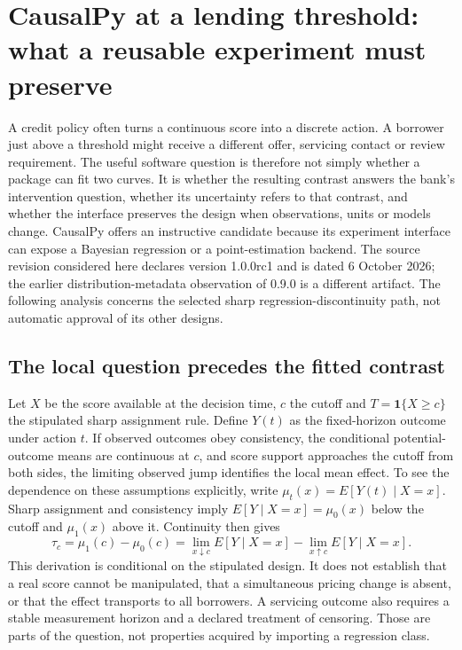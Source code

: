 \section{CausalPy at a lending threshold: what a reusable experiment must preserve}
\label{exec14:causalpy-contract}

A credit policy often turns a continuous score into a discrete action. A borrower
just above a threshold might receive a different offer, servicing contact or
review requirement. The useful software question is therefore not simply whether
a package can fit two curves. It is whether the resulting contrast answers the
bank's intervention question, whether its uncertainty refers to that contrast,
and whether the interface preserves the design when observations, units or models
change. CausalPy offers an instructive candidate because its experiment interface
can expose a Bayesian regression or a point-estimation backend. The source
revision considered here declares version 1.0.0rc1 and is dated 6 October 2026;
the earlier distribution-metadata observation of 0.9.0 is a different artifact.
The following analysis concerns the selected sharp regression-discontinuity
path, not automatic approval of its other designs.~\citep{exec14_causalpy_primary}

\subsection{The local question precedes the fitted contrast}

Let $X$ be the score available at the decision time, $c$ the cutoff and
$T=\mathbf{1}\{X\geq c\}$ the stipulated sharp assignment rule. Define $Y(t)$ as
the fixed-horizon outcome under action $t$. If observed outcomes obey consistency,
the conditional potential-outcome means are continuous at $c$, and score support
approaches the cutoff from both sides, the limiting observed jump identifies
the local mean effect. To see the dependence on these assumptions explicitly,
write $\mu_t(x)=E[Y(t)\mid X=x]$. Sharp assignment and consistency imply
$E[Y\mid X=x]=\mu_0(x)$ below the cutoff and $\mu_1(x)$ above it. Continuity
then gives
\[
 \tau_c=\mu_1(c)-\mu_0(c)
 =\lim_{x\downarrow c}E[Y\mid X=x]-\lim_{x\uparrow c}E[Y\mid X=x].
\]
This derivation is conditional on the stipulated design. It does not establish
that a real score cannot be manipulated, that a simultaneous pricing change is
absent, or that the effect transports to all borrowers. A servicing outcome also
requires a stable measurement horizon and a declared treatment of censoring.
Those are parts of the question, not properties acquired by importing a regression
class.~\citep{exec14_causalpy_exact,exec14_causalpy_decision}

